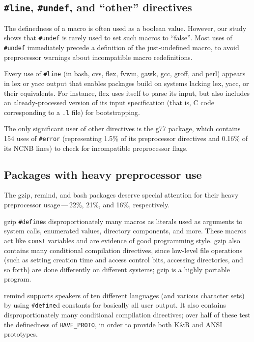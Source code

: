 \documentclass[11pt]{article}
\newcommand{\pkg}[1]{\textsf{#1}}
\begin{document}
\subsection{{\tt \#line}, {\tt \#undef}, and ``other'' directives}

The definedness of a macro is often used as a boolean value.  However, our
study shows that {\tt \#undef} is rarely used to set such macros to
``false''$\!$.  Most uses of {\tt \#undef} immediately precede a definition of
the just-undefined macro, to avoid preprocessor warnings about incompatible
macro redefinitions.  

Every use of {\tt \#line} (in \pkg{bash}, \pkg{cvs}, \pkg{flex}, \pkg{fvwm},
\pkg{gawk}, \pkg{gcc}, \pkg{groff}, and \pkg{perl}) appears in lex or yacc
output that enables packages build on systems lacking lex, yacc, or their
equivalents.  For instance, \pkg{flex} uses itself to parse its input, but
also includes an already-processed version of its input specification (that
is, C code corresponding to a {\tt .l} file) for bootstrapping.

The only significant user of other directives is the \pkg{g77} package, which
contains 154 uses of {\tt \#error} (representing 1.5\% of its preprocessor
directives and 0.16\% of its NCNB lines) to check for incompatible preprocessor
flags.


\subsection{Packages with heavy preprocessor use}

The \pkg{gzip}, \pkg{remind}, and \pkg{bash} packages deserve
special attention for their heavy preprocessor usage\,---\,22\%, 21\%, and
16\%, respectively.

\pkg{gzip} {\tt \#define}s disproportionately many macros as literals used as
arguments to system calls, enumerated values, directory components, and
more.  These macros act like {\tt const} variables and are evidence of good
programming style.  \pkg{gzip} also contains many conditional compilation
directives, since low-level file operations (such as setting creation time
and access control bits, accessing directories, and so forth) are done
differently on different systems; \pkg{gzip} is a highly portable program.

\pkg{remind} supports speakers of ten different languages (and various
character sets) by using {\tt \#define}d constants for basically all user
output.  It also contains disproportionately many conditional compilation
directives; over half of these test the definedness of \verb|HAVE_PROTO|,
in order to provide both K\&R and ANSI prototypes.
\end{document}
